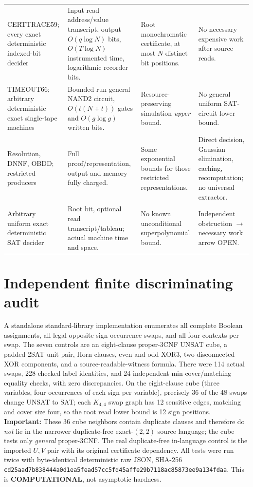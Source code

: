 \documentclass[11pt]{article}
\begin{document}
\begin{longtable}{@{}p{.18\linewidth}p{.27\linewidth}p{.23\linewidth}p{.25\linewidth}@{}}
CERTTRACE59; every exact deterministic indexed-bit decider & Input-read address/value transcript, output $O(q\log N)$ bits, $O(T\log N)$ instrumented time, logarithmic recorder bits. & Root monochromatic certificate, at most $N$ distinct bit positions. & No necessary expensive work after source reads.\\
TIMEOUT66; arbitrary deterministic exact single-tape machines & Bounded-run general NAND2 circuit, $O(t(N+t))$ gates and $O(g\log g)$ written bits. & Resource-preserving simulation \emph{upper} bound. & No general uniform SAT-circuit lower bound.\\
Resolution, DNNF, OBDD; restricted producers & Full proof/representation, output and memory fully charged. & Some exponential bounds for those restricted representations. & Direct decision, Gaussian elimination, caching, recomputation; no universal extractor.\\
Arbitrary uniform exact deterministic SAT decider & Root bit, optional read transcript/tableau; actual machine time and space. & No known unconditional superpolynomial bound. & Independent obstruction $\to$ necessary work arrow OPEN.\\
\bottomrule
\end{longtable}
\normalsize

\section{Independent finite discriminating audit}
A standalone standard-library implementation enumerates all complete Boolean assignments, all legal opposite-sign occurrence swaps, and all four contexts per swap. The seven controls are an eight-clause proper-3CNF UNSAT cube, a padded 2SAT unit pair, Horn clauses, even and odd XOR3, two disconnected XOR components, and a source-readable-witness formula. There were 114 actual swaps, 228 checked label identities, and 24 independent min-cover/matching equality checks, with zero discrepancies. On the eight-clause cube (three variables, four occurrences of each sign per variable), precisely 36 of the 48 swaps change UNSAT to SAT; each $K_{4,4}$ swap graph has 12 sensitive edges, matching and cover size four, so the root read lower bound is 12 sign positions. \textbf{Important:} These 36 cube neighbors contain duplicate clauses and therefore do \emph{not} lie in the narrower duplicate-free exact-$(2,2)$ source language; the cube tests only \emph{general} proper-3CNF. The real duplicate-free in-language control is the imported $U,V$ pair with its original certificate dependency.
All tests were run twice with byte-identical deterministic raw JSON, SHA-256 \texttt{cd25aad7b838444a0d1ea5fead57cc5fd45affe29b7118ac85873ee9a134fdaa}. This is \textbf{COMPUTATIONAL}, not asymptotic hardness.
\end{document}
